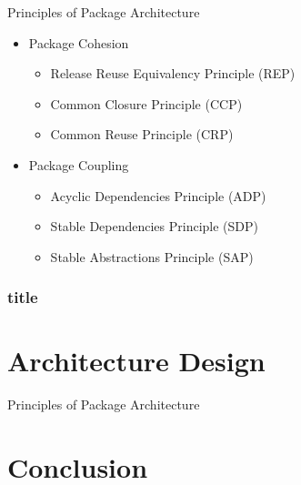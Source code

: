 \documentclass[xcolor=svgnames]{beamer}
\begin{document}

\begin{frame}{Principles of Package Architecture}
    \begin{itemize}
        \item<1-> Package Cohesion
            \begin{itemize}
                \item<3-> Release Reuse Equivalency Principle (REP)
                \item<4-> Common Closure Principle (CCP)
                \item<5-> Common Reuse Principle (CRP)
            \end{itemize}
        \item<2-> Package Coupling
            \begin{itemize}
                \item<6-> Acyclic Dependencies Principle (ADP)
                \item<7-> Stable Dependencies Principle (SDP)
                \item<8-> Stable Abstractions Principle (SAP)
            \end{itemize}
    \end{itemize}
\end{frame}


\begin{frame}[t]\frametitle{title}



\end{frame}

\section{Architecture Design}


\begin{frame}{Principles of Package Architecture}
\end{frame}

\section{Conclusion}
\end{document}
